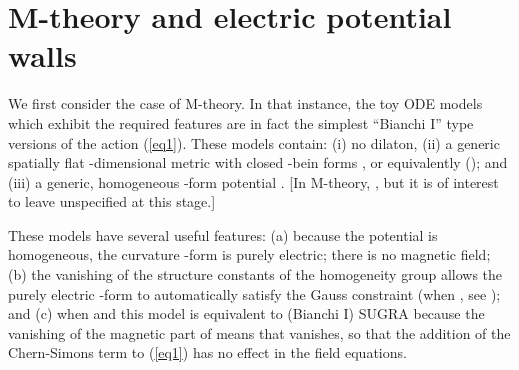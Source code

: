 \documentclass[a4paper,12pt]{article}
\begin{document}
\section{M-theory and electric potential walls}
We first consider the case of M-theory.  
In that instance,
the toy ODE models which exhibit the required features
are in fact the simplest ``Bianchi I'' 
type versions of the action (\ref{eq1}).
These models contain: (i) no 
dilaton, (ii) a generic spatially flat \coordHE{}-dimensional metric 
with closed \coordHE{}-bein forms \coordHE{}, or 
equivalently 
\coordHE{} (\coordHE{});
and (iii) a generic, homogeneous \coordHE{}-form potential
\coordHE{}. 
[In M-theory, \coordHE{}, but it is of interest to leave \coordHE{} unspecified
at this stage.]

These models have several useful features: (a) because
the potential is homogeneous, the 
curvature \coordHE{}-form \coordHE{}  is purely electric;
there is no magnetic field;
(b) the vanishing of the 
structure constants \coordHE{} of the homogeneity group allows the 
purely electric \coordHE{}-form \coordHE{}
to automatically satisfy the Gauss constraint (when 
\coordHE{}, see \cite{Demaretetal}); and (c) when \coordHE{} and 
\coordHE{} this 
model is equivalent to (Bianchi I) SUGRA because the vanishing of the 
magnetic part of \coordHE{} means that \coordHE{} vanishes,
so that the addition of the Chern-Simons term 
\coordHE{} to (\ref{eq1}) has no effect in the field 
equations.
\end{document}
